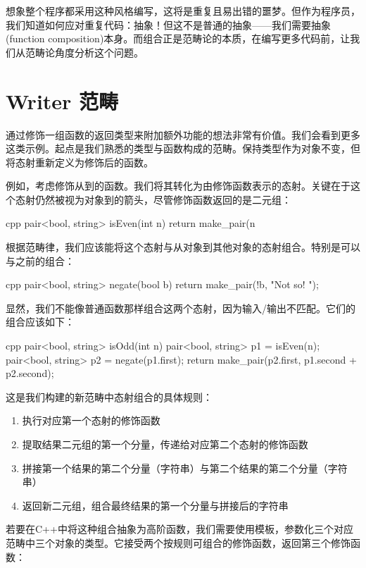 想象整个程序都采用这种风格编写，这将是重复且易出错的噩梦。但作为程序员，我们知道如何应对重复代码：抽象！但这不是普通的抽象——我们需要抽象(function composition)本身。而组合正是范畴论的本质，在编写更多代码前，让我们从范畴论角度分析这个问题。

\section{Writer 范畴}

通过修饰一组函数的返回类型来附加额外功能的想法非常有价值。我们会看到更多这类示例。起点是我们熟悉的类型与函数构成的范畴。保持类型作为对象不变，但将态射重新定义为修饰后的函数。

例如，考虑修饰从到的函数。我们将其转化为由修饰函数表示的态射。关键在于这个态射仍然被视为对象到的箭头，尽管修饰函数返回的是二元组：

\begin{snip}{cpp}
pair<bool, string> isEven(int n) {
    return make_pair(n %
}
\end{snip}
根据范畴律，我们应该能将这个态射与从对象到其他对象的态射组合。特别是可以与之前的组合：

\begin{snip}{cpp}
pair<bool, string> negate(bool b) {
    return make_pair(!b, "Not so! ");
}
\end{snip}
显然，我们不能像普通函数那样组合这两个态射，因为输入/输出不匹配。它们的组合应该如下：

\begin{snip}{cpp}
pair<bool, string> isOdd(int n) {
    pair<bool, string> p1 = isEven(n);
    pair<bool, string> p2 = negate(p1.first);
    return make_pair(p2.first, p1.second + p2.second);
}
\end{snip}
这是我们构建的新范畴中态射组合的具体规则：

\begin{enumerate}
  \tightlist
  \item
        执行对应第一个态射的修饰函数
  \item
        提取结果二元组的第一个分量，传递给对应第二个态射的修饰函数
  \item
        拼接第一个结果的第二个分量（字符串）与第二个结果的第二个分量（字符串）
  \item
        返回新二元组，组合最终结果的第一个分量与拼接后的字符串
\end{enumerate}

若要在C++中将这种组合抽象为高阶函数，我们需要使用模板，参数化三个对应范畴中三个对象的类型。它接受两个按规则可组合的修饰函数，返回第三个修饰函数：

